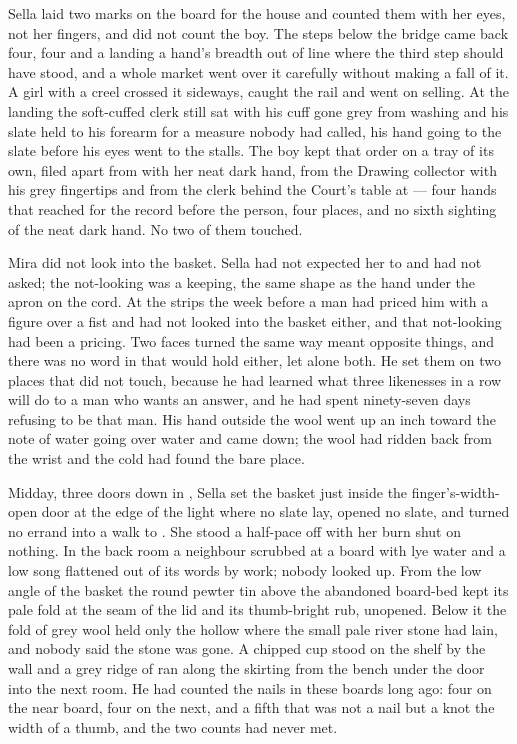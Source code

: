 Sella laid two marks on the board for the house and counted them with her eyes, not her fingers, and did not count the boy. The steps below the bridge came back four, four and a landing a hand's breadth out of line where the third step should have stood, and a whole market went over it carefully without making a fall of it. A girl with a creel crossed it sideways, caught the rail and went on selling. At the landing the soft-cuffed clerk still sat with his cuff gone grey from washing and his slate held to his forearm for a measure nobody had called, his hand going to the slate before his eyes went to the stalls. The boy kept that order on a tray of its own, filed apart from  with her neat dark hand, from the Drawing collector with his grey fingertips and from the clerk behind the Court's table at  --- four hands that reached for the record before the person, four places, and no sixth sighting of the neat dark hand. No two of them touched.

Mira did not look into the basket. Sella had not expected her to and had not asked; the not-looking was a keeping, the same shape as the hand under the apron on the cord. At the strips the week before a man had priced him with a figure over a fist and had not looked into the basket either, and that not-looking had been a pricing. Two faces turned the same way meant opposite things, and there was no word in  that would hold either, let alone both. He set them on two places that did not touch, because he had learned what three likenesses in a row will do to a man who wants an answer, and he had spent ninety-seven days refusing to be that man. His hand outside the wool went up an inch toward the note of water going over water and came down; the wool had ridden back from the wrist and the cold had found the bare place.

\scenebreak

Midday, three doors down in , Sella set the basket just inside the finger's-width-open door at the edge of the light where no slate lay, opened no slate, and turned no errand into a walk to . She stood a half-pace off with her burn shut on nothing. In the back room a neighbour scrubbed at a board with lye water and a low song flattened out of its words by work; nobody looked up. From the low angle of the basket the round pewter tin above the abandoned board-bed kept its pale fold at the seam of the lid and its thumb-bright rub, unopened. Below it the fold of grey wool held only the hollow where the small pale river stone had lain, and nobody said the stone was gone. A chipped cup stood on the shelf by the wall and a grey ridge of  ran along the skirting from the bench under the door into the next room. He had counted the nails in these boards long ago: four on the near board, four on the next, and a fifth that was not a nail but a knot the width of a thumb, and the two counts had never met.

